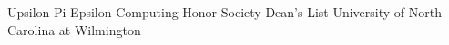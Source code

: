

\begin{cvhonorsTwo}

  \cvhonorTwo
    {Upsilon Pi Epsilon}
    {Computing Honor Society}
  \cvhonorTwo
    {Dean's List}
    {University of North Carolina at Wilmington}
\end{cvhonorsTwo}
